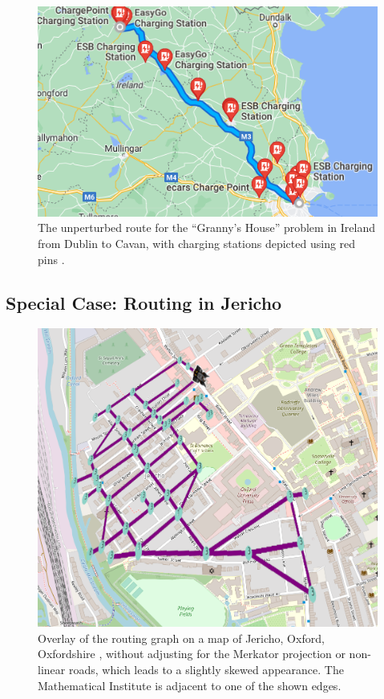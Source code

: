 \documentclass{prettytex/ox/mmsc-special-topic}
\begin{document}
  \begin{figure}[H]
    \centering
    \includegraphics[width=0.4\linewidth]{figures/grannys-stations.png}
    \caption{The unperturbed route for the ``Granny's House'' problem in Ireland from Dublin to Cavan, with charging stations depicted using red pins \parencite{googlemaps}.}
    \label{fig:grannys-stations}
  \end{figure}

  \subsection{Special Case: Routing in Jericho}
  \begin{figure}[H]
    \centering
    \includegraphics[width=0.45\linewidth]{figures/jericho.png}
    \caption{Overlay of the routing graph on a map of Jericho, Oxford, Oxfordshire \parencite{osm}, without adjusting for the Merkator projection or non-linear roads, which leads to a slightly skewed appearance. The Mathematical Institute is adjacent to one of the shown edges.}
    \label{fig:jericho}
  \end{figure}
\end{document}
